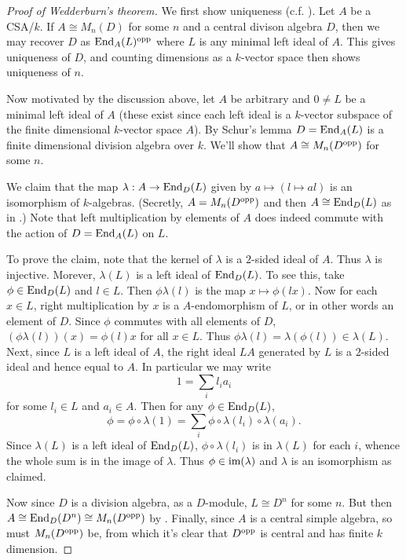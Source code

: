\documentclass[11pt]{amsart}
\numberwithin{equation}{section}
\theoremstyle{remark}
\theoremstyle{remark}
\theoremstyle{remark}
\theoremstyle{definition}
\theoremstyle{definition}
\theoremstyle{definition}
\theoremstyle{definition}
\theoremstyle{definition}
\theoremstyle{definition}
\begin{document}
\begin{proof}[Proof of Wedderburn's theorem]
We first show uniqueness (c.f. ). Let $A$ be a CSA/$k$. If $A\cong M_n(D)$ for some $n$ and a central divison algebra $D$, then we may recover $D$ as $\textup{End}_A(L)^\textup{opp}$ where $L$ is any minimal left ideal of $A$. This gives uniqueness of $D$, and counting dimensions as a $k$-vector space then shows uniqueness of $n$. 

Now motivated by the discussion above, let $A$ be arbitrary and $0\neq L$ be a minimal left ideal of $A$ (these exist since each left ideal is a $k$-vector subspace of the finite dimensional $k$-vector space $A$). By Schur's lemma $D=\textup{End}_A(L)$ is a finite dimensional division algebra over $k$. We'll show that $A\cong M_n(D^\textup{opp})$ for some $n$. 

We claim that the map $\lambda:A\rightarrow \textup{End}_D(L)$ given by $a\mapsto (l\mapsto al)$ is an isomorphism of $k$-algebras. (Secretly, $A=M_n(D^\textup{opp})$ and then $A\cong\textup{End}_D(L)$ as in .) Note that left multiplication by elements of $A$ does indeed commute with the action of $D=\textup{End}_A(L)$ on $L$. 

To prove the claim, note that the kernel of $\lambda$ is a $2$-sided ideal of $A$. Thus $\lambda$ is injective. Morever, $\lambda(L)$ is a left ideal of $\textup{End}_D(L)$. To see this, take $\phi \in \textup{End}_D(L)$ and $l\in L$. Then $\phi \lambda(l)$ is the map $x\mapsto \phi(lx)$. Now for each $x\in L$, right multiplication by $x$ is a $A$-endomorphism of $L$, or in other words an element of $D$. Since $\phi$ commutes with all elements of $D$, $(\phi \lambda(l))(x)=\phi(l)x$ for all $x\in L$. Thus $\phi \lambda(l)=\lambda(\phi(l))\in \lambda(L)$. Next, since $L$ is a left ideal of $A$, the right ideal $LA$ generated by $L$ is a $2$-sided ideal and hence equal to $A$. In particular we may write
\[1=\sum_i l_i a_i\]
for some $l_i\in L$ and $a_i\in A$. Then for any $\phi \in \textup{End}_D(L)$, 
\[\phi=\phi \circ \lambda(1)=\sum_i \phi \circ \lambda(l_i)\circ\lambda(a_i).\]
Since $\lambda(L)$ is a left ideal of $\textup{End}_D(L)$, $\phi \circ \lambda(l_i)$ is in $\lambda(L)$ for each $i$, whence the whole sum is in the image of $\lambda$. Thus $\phi \in \textup{im}(\lambda)$ and $\lambda$ is an isomorphism as claimed.

Now since $D$ is a division algebra, as a $D$-module, $L\cong D^n$ for some $n$. But then $A\cong \textup{End}_D(D^n)\cong M_n(D^\textup{opp})$ by . Finally, since $A$ is a central simple algebra, so must $M_n(D^\textup{opp})$ be, from which it's clear that $D^\textup{opp}$ is central and has finite $k$ dimension. 
\end{proof}
\end{document}
